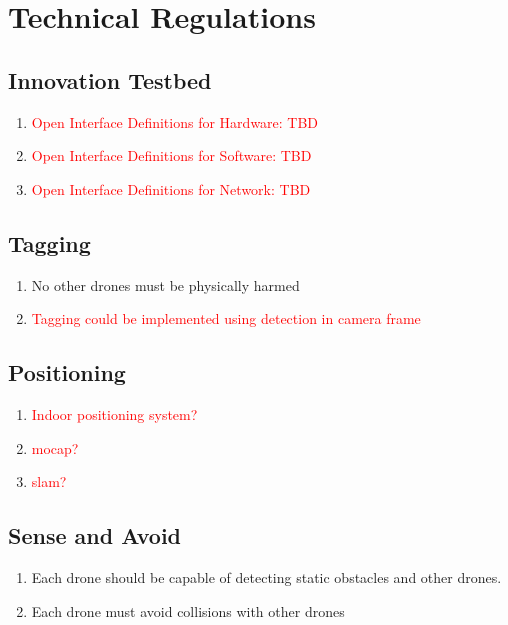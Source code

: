 \section{Technical Regulations}

\subsection{Innovation Testbed}
\begin{enumerate}
	\item{\textcolor{red}{Open Interface Definitions for Hardware: TBD}}
	\item{\textcolor{red}{Open Interface Definitions for Software: TBD}}
	\item{\textcolor{red}{Open Interface Definitions for Network: TBD}}
\end{enumerate}

\subsection{Tagging}
\begin{enumerate}
	\item{No other drones must be physically harmed}
	\item{\textcolor{red}{Tagging could be implemented using detection in camera frame}}
\end{enumerate}

\subsection{Positioning}
\begin{enumerate}
	\item{\textcolor{red}{Indoor positioning system?}}
	\item{\textcolor{red}{mocap?}}
	\item{\textcolor{red}{slam?}}

\end{enumerate}

\subsection{Sense and Avoid}
\begin{enumerate}
	\item{Each drone should be capable of detecting static obstacles and other drones.}
	\item{Each drone must avoid collisions with other drones}
\end{enumerate}

